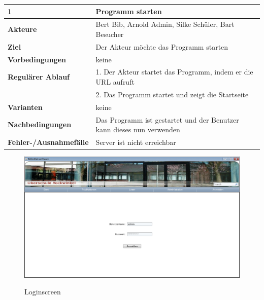 \documentclass[fontsize=12pt,paper=a4,twoside]{scrartcl}
\begin{document}
\begin{table}[htbp]
\label{1}
\begin{tabular}{|l|p{10cm}|}
\hline 
\textbf{1} & \textbf{Programm starten} \\ \hline
\textbf{Akteure} & Bert Bib, Arnold Admin, Silke Schüler, Bart Besucher\\ \hline
\textbf{Ziel} & Der Akteur möchte das Programm starten  \\ \hline
\textbf{Vorbedingungen} & keine \\ \hline
\textbf{Regulärer Ablauf} & 
1. Der Akteur startet das Programm, indem er die URL aufruft \\
&2. Das Programm startet und zeigt die Startseite \\ \hline
\textbf{Varianten} & keine \\ \hline
\textbf{Nachbedingungen} & Das Programm ist gestartet und der Benutzer kann dieses nun verwenden\\ 
\hline
\textbf{Fehler-/Ausnahmefälle} & Server ist nicht erreichbar \\ \hline
\end{tabular}
\end{table}

\begin{figure}[htbp]
\caption{Loginscreen}
\includegraphics[width=1\textwidth]{WebApp-Screens/Loginscreen.png}
  \label{login}
\end{figure}
\end{document}
